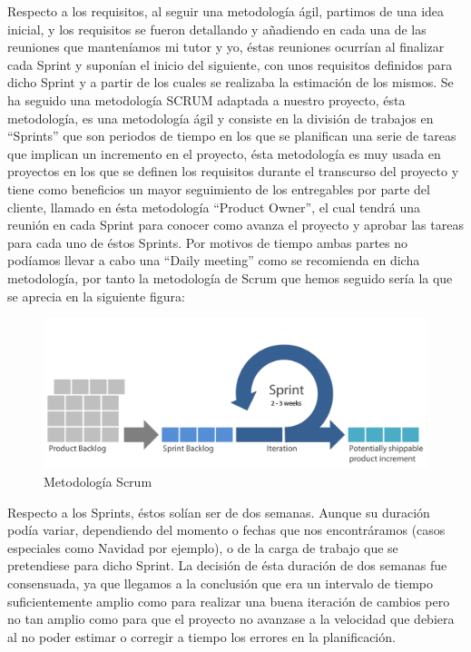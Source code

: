 \documentclass[11pt,openany]{book}
\begin{document}
Respecto a los requisitos, al seguir una metodología ágil, partimos de una idea inicial, y los requisitos se fueron detallando y añadiendo en cada una de las reuniones que manteníamos mi tutor y yo, éstas reuniones ocurrían al finalizar cada Sprint y suponían el inicio del siguiente, con unos requisitos definidos para dicho Sprint y a partir de los cuales se realizaba la estimación de los mismos. Se ha seguido una metodología SCRUM adaptada a nuestro proyecto, ésta metodología, es una metodología ágil y consiste en la división de trabajos en ``Sprints'' que son periodos de tiempo en los que se planifican una serie de tareas que implican un incremento en el proyecto, ésta metodología es muy usada en proyectos en los que se definen los requisitos durante el transcurso del proyecto y tiene como beneficios un mayor seguimiento de los entregables por parte del cliente, llamado en ésta metodología ``Product Owner'', el cual tendrá una reunión en cada Sprint para conocer como avanza el proyecto y aprobar las tareas para cada uno de éstos Sprints. Por motivos de tiempo ambas partes no podíamos llevar a cabo una ``Daily meeting'' como se recomienda en dicha metodología, por tanto la metodología de Scrum que hemos seguido sería la que se aprecia en la siguiente figura:

\begin{figure}[H]
\includegraphics[totalheight=5cm]{scrum.png}
\caption{Metodología Scrum}
\end{figure}
\par\bigskip 
\noindent

Respecto a los Sprints, éstos solían ser de dos semanas. Aunque su duración podía variar, dependiendo del momento o fechas que nos encontráramos (casos especiales como Navidad por ejemplo), o de la carga de trabajo que se pretendiese para dicho Sprint. La decisión de ésta duración de dos semanas fue consensuada, ya que llegamos a la conclusión que era un intervalo de tiempo suficientemente amplio como para realizar una buena iteración de cambios pero no tan amplio como para que el proyecto no avanzase a la velocidad que debiera al no poder estimar o corregir a tiempo los errores en la planificación.
\end{document}
